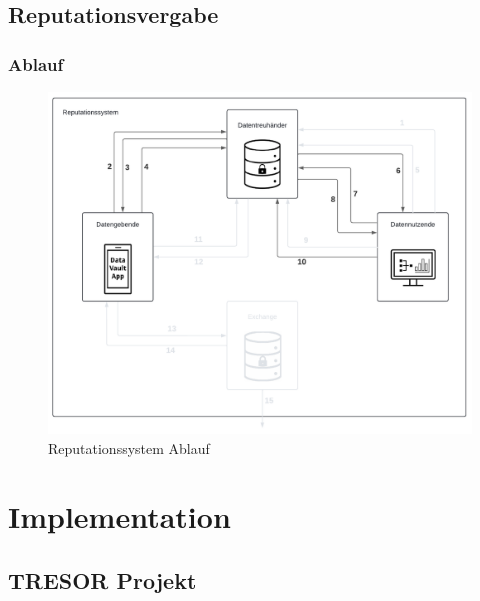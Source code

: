 \documentclass[11pt,a4paper]{scrreprt}
\begin{document}
\section{Reputationsvergabe}
\label{system:reputation}
\subsection{Ablauf}
\begin{figure}[H]
    \centering
    \includegraphics[width=0.9\linewidth]{ReputationDiagramm.pdf}
    \caption{Reputationssystem Ablauf}
    \label{fig:reputation}
\end{figure} 



\chapter{Implementation}


\section{TRESOR Projekt}

\end{document}
